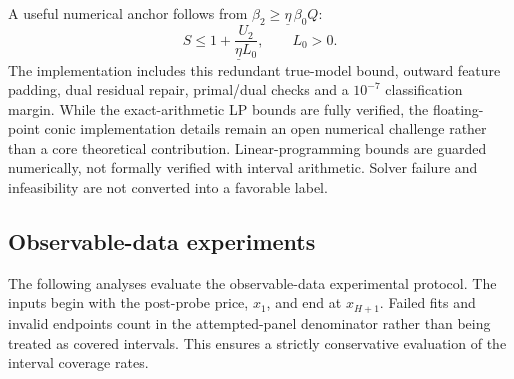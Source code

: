 \documentclass[10pt,twocolumn,letterpaper]{article}
\theoremstyle{definition}
\theoremstyle{remark}
\begin{document}
A useful numerical anchor follows from $\beta_2\ge\underline\eta\,\beta_0Q$:
\begin{equation}
 S\le 1+\frac{U_2}{\underline\eta L_0},\qquad L_0>0.
 \label{eq:observable_cap}
\end{equation}
The implementation includes this redundant true-model bound, outward feature padding, dual residual repair, primal/dual checks and a $10^{-7}$ classification margin. While the exact-arithmetic LP bounds are fully verified, the floating-point conic implementation details remain an open numerical challenge rather than a core theoretical contribution. Linear-programming bounds are guarded numerically, not formally verified with interval arithmetic. Solver failure and infeasibility are not converted into a favorable label.

\subsection{Observable-data experiments}
\label{sec:observable_results}
The following analyses evaluate the observable-data experimental protocol. The inputs begin with the post-probe price, $x_1$, and end at $x_{H+1}$. Failed fits and invalid endpoints count in the attempted-panel denominator rather than being treated as covered intervals. This ensures a strictly conservative evaluation of the interval coverage rates.
\end{document}
